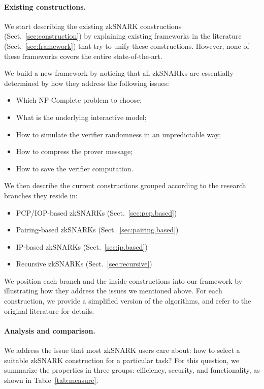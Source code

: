 \documentclass[acmtog]{acmart}
\begin{document}
\paragraph{Existing constructions.}
We start describing the existing zkSNARK constructions (Sect.~\ref{sec:construction}) by explaining existing frameworks in the literature (Sect.~\ref{sec:framework}) that try to unify these constructions.
However, none of these frameworks covers the entire state-of-the-art.

We build a new framework by noticing that all zkSNARKs are essentially determined by how they address the following issues:
\begin{itemize}
	\item Which NP-Complete problem to choose;
	\item What is the underlying interactive model;
	\item How to simulate the verifier randomness in an unpredictable way;
	\item How to compress the prover message;
	\item How to save the verifier computation.
\end{itemize}

We then describe the current constructions grouped according to the research branches they reside in:
\begin{itemize}
	\item PCP/IOP-based zkSNARKs (Sect.~\ref{sec:pcp.based})
	\item Pairing-based zkSNARKs (Sect.~\ref{sec:pairing.based})
	\item IP-based zkSNARKs (Sect.~\ref{sec:ip.based})
	\item Recursive zkSNARKs (Sect.~\ref{sec:recursive})
\end{itemize}
We position each branch and the inside constructions into our framework by illustrating how they address the issues we mentioned above.
For each construction, we provide a simplified version of the algorithms, and refer to the original literature for details.

\paragraph{Analysis and comparison.}
We address the issue that most zkSNARK users care about: how to select a suitable zkSNARK construction for a particular task?
For this question, we summarize the properties in three groups: efficiency, security, and functionality, as shown in Table~\ref{tab:measure}.
\end{document}
